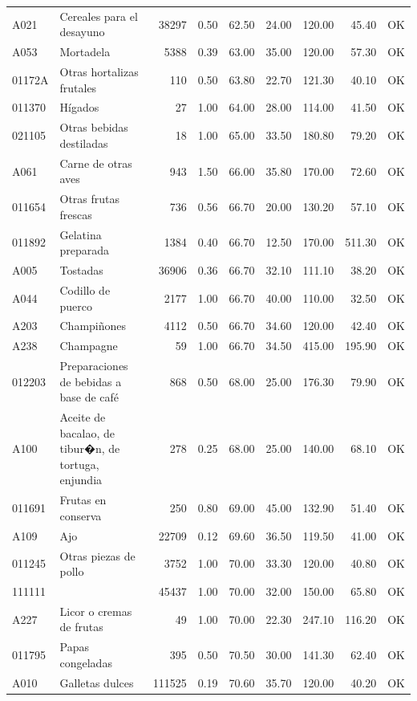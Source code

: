 \begin{table}[ht]
\begin{tabular}{llrrrrrrl}
  A021 & Cereales para el desayuno & 38297 & 0.50 & 62.50 & 24.00 & 120.00 & 45.40 & OK \\ 
  A053 & Mortadela & 5388 & 0.39 & 63.00 & 35.00 & 120.00 & 57.30 & OK \\ 
  01172A & Otras hortalizas frutales & 110 & 0.50 & 63.80 & 22.70 & 121.30 & 40.10 & OK \\ 
  011370 & Hígados &  27 & 1.00 & 64.00 & 28.00 & 114.00 & 41.50 & OK \\ 
  021105 & Otras bebidas destiladas &  18 & 1.00 & 65.00 & 33.50 & 180.80 & 79.20 & OK \\ 
  A061 & Carne de otras aves & 943 & 1.50 & 66.00 & 35.80 & 170.00 & 72.60 & OK \\ 
  011654 & Otras frutas frescas & 736 & 0.56 & 66.70 & 20.00 & 130.20 & 57.10 & OK \\ 
  011892 & Gelatina preparada & 1384 & 0.40 & 66.70 & 12.50 & 170.00 & 511.30 & OK \\ 
  A005 & Tostadas & 36906 & 0.36 & 66.70 & 32.10 & 111.10 & 38.20 & OK \\ 
  A044 & Codillo de puerco & 2177 & 1.00 & 66.70 & 40.00 & 110.00 & 32.50 & OK \\ 
  A203 & Champiñones & 4112 & 0.50 & 66.70 & 34.60 & 120.00 & 42.40 & OK \\ 
  A238 & Champagne &  59 & 1.00 & 66.70 & 34.50 & 415.00 & 195.90 & OK \\ 
  012203 & Preparaciones de bebidas a base de café & 868 & 0.50 & 68.00 & 25.00 & 176.30 & 79.90 & OK \\ 
  A100 & Aceite de bacalao, de tibur�n, de tortuga, enjundia & 278 & 0.25 & 68.00 & 25.00 & 140.00 & 68.10 & OK \\ 
  011691 & Frutas en conserva & 250 & 0.80 & 69.00 & 45.00 & 132.90 & 51.40 & OK \\ 
  A109 & Ajo & 22709 & 0.12 & 69.60 & 36.50 & 119.50 & 41.00 & OK \\ 
  011245 & Otras piezas de pollo & 3752 & 1.00 & 70.00 & 33.30 & 120.00 & 40.80 & OK \\ 
  111111 &  & 45437 & 1.00 & 70.00 & 32.00 & 150.00 & 65.80 & OK \\ 
  A227 & Licor o cremas de frutas &  49 & 1.00 & 70.00 & 22.30 & 247.10 & 116.20 & OK \\ 
  011795 & Papas congeladas & 395 & 0.50 & 70.50 & 30.00 & 141.30 & 62.40 & OK \\ 
  A010 & Galletas dulces & 111525 & 0.19 & 70.60 & 35.70 & 120.00 & 40.20 & OK \\ 

\end{tabular}
\end{table}

